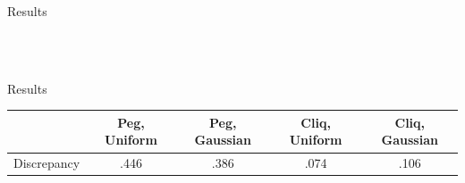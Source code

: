 \documentclass{beamer}
\begin{document}
\begin{frame}{Results}
	\begin{figure}
		\centering
		 \\
		 \\
	\end{figure}

\end{frame}

\begin{frame}{Results}
	\small
	\begin{center}
	\begin{tabular}{c|c|c|c|c}
		& Peg, Uniform & Peg, Gaussian & Cliq, Uniform & Cliq, Gaussian \\
		\hline
		Discrepancy & .446 &   .386 & .074 & .106 \\
	\end{tabular}
\end{center}
\end{frame}

\begin{frame}
	 
	
\end{frame}
\end{document}
